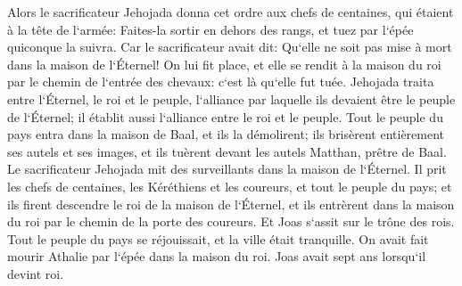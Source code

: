 \verse Alors le sacrificateur Jehojada donna cet ordre aux chefs de centaines, qui étaient à la tête de l`armée: Faites-la sortir en dehors des rangs, et tuez par l`épée quiconque la suivra. Car le sacrificateur avait dit: Qu`elle ne soit pas mise à mort dans la maison de l`Éternel! 
\verse On lui fit place, et elle se rendit à la maison du roi par le chemin de l`entrée des chevaux: c`est là qu`elle fut tuée. 
\verse Jehojada traita entre l`Éternel, le roi et le peuple, l`alliance par laquelle ils devaient être le peuple de l`Éternel; il établit aussi l`alliance entre le roi et le peuple. 
\verse Tout le peuple du pays entra dans la maison de Baal, et ils la démolirent; ils brisèrent entièrement ses autels et ses images, et ils tuèrent devant les autels Matthan, prêtre de Baal. Le sacrificateur Jehojada mit des surveillants dans la maison de l`Éternel. 
\verse Il prit les chefs de centaines, les Kéréthiens et les coureurs, et tout le peuple du pays; et ils firent descendre le roi de la maison de l`Éternel, et ils entrèrent dans la maison du roi par le chemin de la porte des coureurs. Et Joas s`assit sur le trône des rois. 
\verse Tout le peuple du pays se réjouissait, et la ville était tranquille. On avait fait mourir Athalie par l`épée dans la maison du roi. 
\verse Joas avait sept ans lorsqu`il devint roi. 

